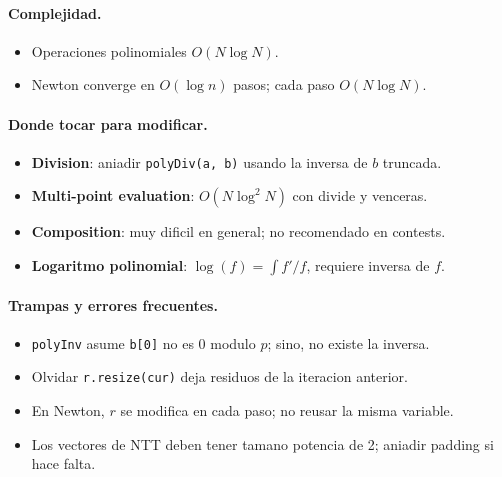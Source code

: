 \paragraph{Complejidad.}
\begin{itemize}\setlength\itemsep{0pt}
	\item Operaciones polinomiales $O(N \log N)$.
	\item Newton converge en $O(\log n)$ pasos; cada paso $O(N \log N)$.
\end{itemize}

\paragraph{Donde tocar para modificar.}
\begin{itemize}\setlength\itemsep{0pt}
	\item \textbf{Division}: aniadir \texttt{polyDiv(a, b)} usando la inversa de $b$ truncada.
	\item \textbf{Multi-point evaluation}: $O(N \log^2 N)$ con divide y venceras.
	\item \textbf{Composition}: muy dificil en general; no recomendado en contests.
	\item \textbf{Logaritmo polinomial}: $\log(f) = \int f'/f$, requiere inversa de $f$.
\end{itemize}

\paragraph{Trampas y errores frecuentes.}
\begin{itemize}\setlength\itemsep{0pt}
	\item \texttt{polyInv} asume \texttt{b[0]} no es 0 modulo $p$; sino, no existe la inversa.
	\item Olvidar \texttt{r.resize(cur)} deja residuos de la iteracion anterior.
	\item En Newton, $r$ se modifica en cada paso; no reusar la misma variable.
	\item Los vectores de NTT deben tener tamano potencia de 2; aniadir padding si hace falta.
\end{itemize}

